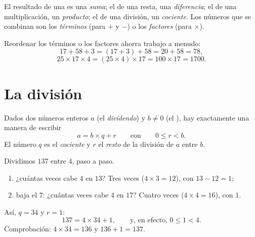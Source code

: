 \begin{remark}[Vocabulario]
El resultado de una  es una \emph{suma}; el de una resta, una
\emph{diferencia}; el de una multiplicación, un
\emph{producto}; el de una división, un
\emph{cociente}. Los números que se combinan son los
\emph{términos} (para $+$ y $-$) o los \emph{factores} (para $\times$).
\end{remark}

\begin{example}\label{ex:g6:wholes:smart}
Reordenar los términos o los factores ahorra trabajo a menudo:
\[
17 + 58 + 3 = (17 + 3) + 58 = 20 + 58 = 78 ,
\]
\[
25 \times 17 \times 4 = (25 \times 4) \times 17 = 100 \times 17 = 1700 .
\]
\end{example}

\section{La división}

\begin{theorem}\label{thm:g6:wholes:division}
Dados dos números enteros $a$ (el \emph{dividendo}) y $b \neq 0$ (el
\emph{}), hay exactamente una manera de escribir
\[
a = b \times q + r
\qquad\text{con}\qquad
0 \leq r < b .
\]
El número $q$ es el \emph{cociente} y $r$ el
\emph{resto} de la división de $a$ entre $b$.
\end{theorem}
\admitted

\begin{example}\label{ex:g6:wholes:division}
Dividimos $137$ entre $4$, paso a paso.
\begin{enumerate}
  \item ¿cuántas veces cabe $4$ en $13$? Tres veces
        ($4 \times 3 = 12$), con  $13 - 12 = 1$;
  \item baja el $7$: ¿cuántas veces cabe $4$ en $17$?
        Cuatro veces ($4 \times 4 = 16$), con  $1$.
\end{enumerate}
Así, $q = 34$ y $r = 1$:
\[
137 = 4 \times 34 + 1, \qquad\text{y, en efecto, } 0 \leq 1 < 4 .
\]
Comprobación: $4 \times 34 = 136$ y $136 + 1 = 137$.
\end{example}

